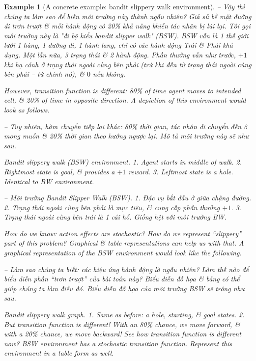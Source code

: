 \documentclass{article}
\newtheorem{example}{Example}
\begin{document}
\begin{itemize}
\begin{itemize}
\begin{itemize}
\begin{example}[A concrete example: bandit slippery walk environment]
                -- Vậy thì chúng ta làm sao để biến môi trường này thành ngẫu nhiên? Giả sử bề mặt đường đi trơn trượt \& mỗi hành động có 20\% khả năng khiến tác nhân bị lùi lại. Tôi gọi môi trường này là "đi bộ kiểu bandit slipper walk" (BSW). BSW vẫn là 1 thế giới lưới 1 hàng, 1 đường đi, 1 hành lang, chỉ có các hành động Trái \& Phải khả dụng. Một lần nữa, 3 trạng thái \& 2 hành động. Phần thưởng vẫn như trước, $+1$ khi hạ cánh ở trạng thái ngoài cùng bên phải (trừ khi đến từ trạng thái ngoài cùng bên phải -- từ chính nó), \& $0$ nếu không.

                However, transition function is different: 80\% of time agent moves to intended cell, \& 20\% of time in opposite direction. A depiction of this environment would look as follows.

                -- Tuy nhiên, hàm chuyển tiếp lại khác: 80\% thời gian, tác nhân di chuyển đến ô mong muốn \& 20\% thời gian theo hướng ngược lại. Mô tả môi trường này sẽ như sau.

                {\sf Bandit slippery walk (BSW) environment.} 1. Agent starts in middle of walk. 2. Rightmost state is goal, \& provides a $+1$ reward. 3. Leftmost state is a hole. Identical to BW environment.

                -- {\sf Môi trường Bandit Slipper Walk (BSW).} 1. Đặc vụ bắt đầu ở giữa chặng đường. 2. Trạng thái ngoài cùng bên phải là mục tiêu, \& cung cấp phần thưởng $+1$. 3. Trạng thái ngoài cùng bên trái là 1 cái hố. Giống hệt với môi trường BW.

                How do we know: action effects are stochastic? How do we represent ``slippery'' part of this problem? Graphical \& table representations can help us with that. A graphical representation of the BSW environment would look like the following.

                -- Làm sao chúng ta biết: các hiệu ứng hành động là ngẫu nhiên? Làm thế nào để biểu diễn phần ``trơn trượt'' của bài toán này? Biểu diễn đồ họa \& bảng có thể giúp chúng ta làm điều đó. Biểu diễn đồ họa của môi trường BSW sẽ trông như sau.

                {\sf Bandit slippery walk graph.} 1. Same as before: a hole, starting, \& goal states. 2. But transition function is different! With an 80\% chance, we move forward, \& with a 20\% chance, we move backward! See how transition function is different now? BSW environment has a stochastic transition function. Represent this environment in a table form as well.


\end{example}
\end{itemize}
\end{itemize}
\end{itemize}
\end{document}
